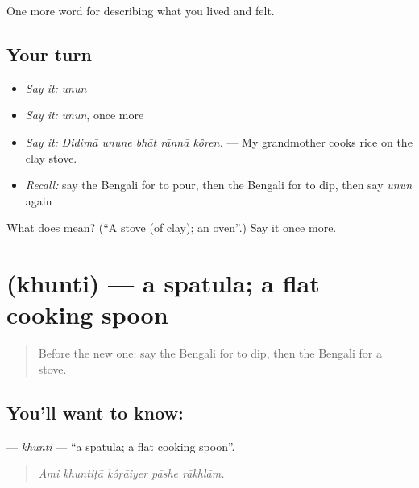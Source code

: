 \begin{grammarlens}[title={What you've built}]
One more word for describing what you lived and felt.
\end{grammarlens}

\subsection*{Your turn}
\begin{itemize}
\raggedright
  \item \emph{Say it:} \emph{unun}
  \item \emph{Say it:} \emph{unun}, once more
  \item \emph{Say it:} \emph{Didimā unune bhāt rānnā kôren.} — My grandmother cooks rice on the clay stove.
  \item \emph{Recall:} say the Bengali for to pour, then the Bengali for to dip, then say \emph{unun} again
\end{itemize}

\begin{tcolorbox}[breakable,colback=teal!4,colframe=teal!35!black,title={Before you move on}]
What does  mean? (\textquotedblleft{}A stove (of clay); an oven\textquotedblright{}.) Say it once more.
\end{tcolorbox}
\section[\texorpdfstring{\bn{খুন্তি} (khunti)}{খুন্তি (khunti)}]{ (khunti) — a spatula; a flat cooking spoon}

\label{lesson:BN-C512-khunti}



\begin{quote}
Before the new one: say the Bengali for to dip, then the Bengali for a stove.
\end{quote}

\subsection*{You'll want to know: }
\textbf{} — \emph{khunti} — \textquotedblleft{}a spatula; a flat cooking spoon\textquotedblright{}.

\begin{quote}
    
\end{quote}

\begin{quote}
\emph{Āmi khuntiṭā kôṛāiyer pāshe rākhlām.}
\end{quote}


